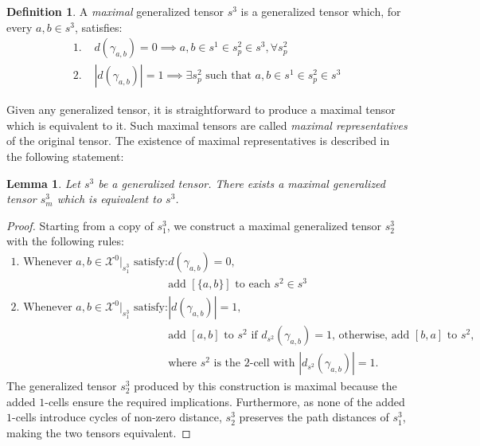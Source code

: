 \documentclass{article}
\theoremstyle{plain}
\newtheorem{lemma}[theorem]{Lemma}
\theoremstyle{definition}
\newtheorem{definition}[theorem]{Definition}
\theoremstyle{remark}
\newcommand{\cX}{\mathcal{X}}
\begin{document}
\begin{definition}
	A \textit{maximal} generalized tensor $s^3$ is a generalized tensor which, for every $a, b \in s^3$, satisfies:
	\begin{equation*}
		\begin{aligned}
			\textit{1. } & d(\gamma_{a, b}) = 0 \implies a, b \in s^1 \in s^2_p \in s^3, \forall s^2_p\\
			\textit{2. } & |d(\gamma_{a,b})| = 1 \implies \exists s^2_p \text{ such that } a, b \in s^1 \in s^2_p \in s^3
		\end{aligned}
	\end{equation*}
\end{definition}
Given any generalized tensor, it is straightforward to produce a maximal tensor which is equivalent to it. Such maximal tensors are called \textit{maximal representatives} of the original tensor. The existence of maximal representatives is described in the following statement:
\begin{lemma}
	Let $s^3$ be a generalized tensor. There exists a maximal generalized tensor $s^3_m$ which is equivalent to $s^3$.
	\label{prop:MaximalGenTensors}
\end{lemma}
\begin{proof}
	Starting from a copy of $s^3_1$, we construct a maximal generalized tensor $s^3_2$ with the following rules:
	\begin{equation*}
		\begin{aligned}
			\text{1. Whenever } a,b \in \cX^0|_{s^3_1} \text{ satisfy: }& d(\gamma_{a, b}) = 0 \text{,}\\
			&\text{add } [\{a, b\}] \text{ to each } s^2 \in s^3\\
			\text{2. Whenever } a,b \in \cX^0|_{s^3_1} \text{ satisfy: }& |d(\gamma_{a, b})| = 1 \text{,}\\
			&\text{add } [a, b] \text{ to } s^2 \text{ if } d_{s^2}(\gamma_{a,b}) = 1 \text{, otherwise, add } [b, a] \text{ to } s^2,\\
			&\text{where $s^2$ is the $2$-cell with } |d_{s^2}(\gamma_{a,b})| = 1.
		\end{aligned}
	\end{equation*}
	The generalized tensor $s^3_2$ produced by this construction is maximal because the added $1$-cells ensure the required implications. Furthermore, as none of the added $1$-cells introduce cycles of non-zero distance, $s^3_2$ preserves the path distances of $s^3_1$, making the two tensors equivalent.
\end{proof}
\end{document}
